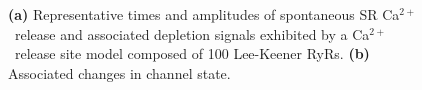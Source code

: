 \documentclass[a0]{a0poster}
\def\Ca{Ca$^{2+}$}
\def\Head#1{\noindent{\begin{center}\LARGE\color{DarkBlue} #1\end{center}}}
\begin{document}
\begin{textblock}{6}
\begin{center}
\begin{figure}
\vspace{-0.2in}
\caption{{\bf (a)} Representative times and amplitudes of spontaneous SR \Ca\ release and associated depletion signals exhibited by a \Ca\ release site model composed of 100 Lee-Keener RyRs.  {\bf (b)} Associated changes in channel state.}


\label{fig:Spark_trace}
\end{figure}
\end{center}

\end{textblock}


\end{document}
